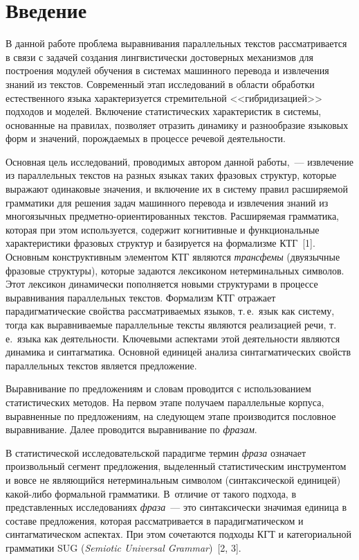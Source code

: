       \begin{multicols}{2}

            \label{st\stat}

    \section{Введение}

     В данной работе проблема выравнивания параллельных текстов
рассматривается в связи с задачей создания лингвистически достоверных
механизмов для построения модулей обучения в системах машинного перевода и
извлечения знаний из текстов. Современный этап исследований в области
обработки естественного языка характеризуется стремительной <<гибридизацией>>
подходов и моделей. Включение статистических характеристик в системы,
основанные на правилах, позволяет отразить динамику и разнообразие языковых
форм и значений, порождаемых в процессе речевой де\-я\-тель\-ности.

     Основная цель исследований, проводимых автором данной работы,~---
извлечение из параллельных текстов на разных языках таких фразовых структур,
которые выражают одинаковые значения, и включение их в систему правил
расширяемой грамматики для решения задач машинного перевода и извлечения
знаний из многоязычных пред\-мет\-но-ори\-ен\-ти\-ро\-ван\-ных текстов.
Расширяемая грамматика, которая при этом используется, содержит когнитивные
и функциональные характеристики фразовых структур и базируется на
формализме КТГ~[1]. Основным
конструктивным элементом КТГ являются \textit{трансфемы} (двуязычные
фразовые структуры), которые задаются лексиконом нетерминальных символов.
Этот лексикон динамически пополняется новыми структурами в процессе
выравнивания параллельных текстов. Формализм КТГ отражает
парадигматические свойства рас\-смат\-ри\-ва\-емых языков, т.\,е.\ язык как сис\-те\-му,
тогда как выравниваемые параллельные тексты являются реализацией речи, т.\,е.\
языка как деятельности. Ключевыми аспектами этой деятельности являются
динамика и синтагматика. Основной единицей анализа синтагматических свойств
параллельных текстов является предложение.

   Выравнивание по предложениям и словам проводится с использованием
статистических методов. На первом этапе получаем параллельные корпуса,
выравненные по предложениям, на следующем этапе производится пословное
выравнивание. Далее проводится выравнивание по \textit{фразам}.

   В статистической исследовательской парадигме термин \textit{фраза} означает
произвольный сегмент предложения, выделенный статистическим инстру\-ментом
и вовсе не являющийся нетерминальным символом (синтаксической единицей)
ка\-кой-ли\-бо формальной грамматики. В~отличие от такого подхода, в
представленных исследованиях \textit{фраза}~--- это синтаксически значимая
единица в составе предложения, которая рассматривается в парадигматическом и
синтагматическом аспектах. При этом сочетаются подходы КГТ
и категориальной грамматики SUG (\textit{Semiotic
Universal Grammar})~[2, 3].


\end{multicols}
